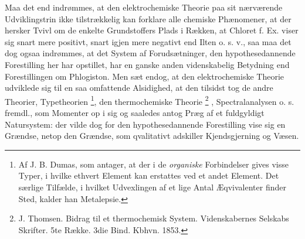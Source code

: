 \documentclass[12pt,a4paper]{book}
\renewcommand{\thefootnote}{*)}
\begin{document}
Maa det end indrømmes, at den elektrochemiske Theorie paa sit nærværende
Udviklingstrin ikke tilstrækkelig kan forklare alle chemiske Phænomener,
at der hersker Tvivl om de enkelte Grundstoffers Plads i Rækken, at
Chloret f. Ex. viser sig snart mere positivt, snart igjen mere negativt
end Ilten o. s. v., saa maa det dog ogsaa indrømmes, at det System af
Forudsætninger, den hypothesedannende Forestilling her har opstillet, har
en ganske anden videnskabelig Betydning end Forestillingen om Phlogiston.
Men sæt endog, at den elektrochemiske Theorie udviklede sig til en saa
omfattende Alsidighed, at den tilsidst tog de andre Theorier,
Typetheorien%
\footnote{%
Af J. B. Dumas, som antager, at der i de \emph{organiske} Forbindelser
gives visse Typer, i hvilke ethvert Element kan erstattes ved et andet
Element. Det særlige Tilfælde, i hvilket Udvexlingen af et lige Antal
Æqvivalenter finder Sted, kalder han Metalepsie.}, den thermochemiske
Theorie%
\renewcommand{\thefootnote}{**)}%
\footnote{%
J. Thomsen. Bidrag til et thermochemisk System. Videnskabernes Selskabs
Skrifter. 5te Række. 3die Bind. Kbhvn. 1853.}%
\renewcommand{\thefootnote}{*)}%
, Spectralanalysen o. s. fremdl., som Momenter op i sig og saaledes antog
Præg af et fuldgyldigt Natursystem: der vilde dog
for den hypothesedannende Forestilling vise sig en Grændse, netop den
Grændse, som qvalitativt adskiller Kjendsgjerning og Væsen.
\end{document}
